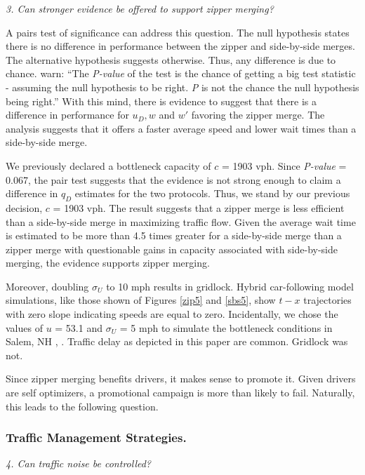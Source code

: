 \documentclass[Proceedings]{ascelike}
\begin{document}
\noindent \emph{3. Can stronger evidence be offered to support  zipper merging?}

A pairs test of significance can address this question. The null hypothesis states there is no difference in performance between the zipper and side-by-side merges. The alternative hypothesis suggests otherwise. Thus, any difference is due to chance.  warn: ``The \emph{P-value} of the test is the chance of getting a big test statistic - assuming the null hypothesis to be right. \emph{P} is not the chance the null hypothesis being right.'' With this mind, there is evidence to suggest that there is a difference in performance for $u_D, w$ and $w'$ favoring the zipper merge. The analysis suggests that it offers a faster average speed and lower wait times than a side-by-side merge. 

We previously declared  a bottleneck capacity of $c$ = 1903 vph. Since \emph{P-value} = 0.067, the pair test suggests that the evidence is not strong enough to claim a difference in $q_D$ estimates for the two protocols. Thus, we stand by our previous decision, $c$ = 1903 vph. The result suggests that a zipper merge is less efficient than a side-by-side merge in maximizing traffic flow. Given the average wait time is estimated to be more than 4.5 times greater for a side-by-side merge than a zipper merge with questionable gains in capacity associated with side-by-side merging, the evidence supports zipper merging.

Moreover, doubling $\sigma_U$ to 10 mph results in gridlock. Hybrid car-following model simulations, like those shown of Figures \ref{zip5}  and \ref{sbs5}, show $t-x$ trajectories with zero slope indicating speeds are equal to zero. Incidentally, we chose the values of $u$ = 53.1 and  $\sigma_U$ = 5 mph to  simulate the bottleneck conditions in Salem, NH \cite{Laflamme2017}, \cite{Laflamme2018a}. Traffic delay as depicted in this paper are common. Gridlock was not.

Since zipper merging benefits drivers, it makes sense to promote it. Given drivers are self optimizers, a promotional campaign is more than likely to fail. Naturally, this leads to the following question.
 
\subsubsection{Traffic Management Strategies.}

\noindent \emph{4. Can traffic noise be controlled?}
\end{document}
